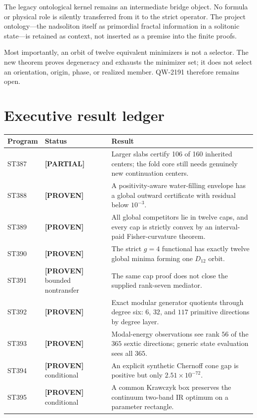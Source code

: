 \documentclass[11pt,a4paper]{article}
\newcommand{\Proven}{\textcolor{green!40!black}{\textbf{[PROVEN]}}}
\newcommand{\Partial}{\textcolor{orange!80!black}{\textbf{[PARTIAL]}}}
\begin{document}
The legacy ontological kernel remains an intermediate bridge object.  No formula or
physical role is silently transferred from it to the strict operator.  The project
ontology---the nadsoliton itself as primordial fractal information in a solitonic
state---is retained as context, not inserted as a premise into the finite proofs.

Most importantly, an orbit of twelve equivalent minimizers is not a selector.  The
new theorem proves degeneracy and exhausts the minimizer set; it does not select an
orientation, origin, phase, or realized member.  QW-2191 therefore remains open.

\section{Executive result ledger}
\small
\begin{longtable}{>{\raggedright\arraybackslash}p{}>{\raggedright\arraybackslash}p{}>{\raggedright\arraybackslash}p{}}
\toprule Program&Status&Result\\\midrule\endhead
ST387&\Partial&Larger slabs certify 106 of 160 inherited centers; the fold core still needs genuinely new continuation centers.\\
ST388&\Proven&A positivity-aware water-filling envelope has a global outward certificate with residual below $10^{-3}$.\\
ST389&\Proven&All global competitors lie in twelve caps, and every cap is strictly convex by an interval-paid Fisher-curvature theorem.\\
ST390&\Proven&The strict $g=4$ functional has exactly twelve global minima forming one $D_{12}$ orbit.\\
ST391&\Proven{} bounded nontransfer&The same cap proof does not close the supplied rank-seven mediator.\\
ST392&\Proven&Exact modular generator quotients through degree six: $6$, $32$, and $117$ primitive directions by degree layer.\\
ST393&\Proven&Modal-energy observations see rank $56$ of the $365$ sextic directions; generic state evaluation sees all $365$.\\
ST394&\Proven{} conditional&An explicit synthetic Chernoff cone gap is positive but only $2.51\times10^{-72}$.\\
ST395&\Proven{} conditional&A common Krawczyk box preserves the continuum two-band IR optimum on a parameter rectangle.\\

\end{longtable}
\end{document}
